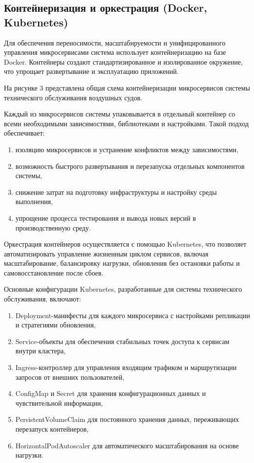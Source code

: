 \documentclass[14pt,a4paper]{extarticle}
\begin{document}
\subsection{Контейнеризация и оркестрация (Docker, Kubernetes)}

Для обеспечения переносимости, масштабируемости и унифицированного управления микросервисами система использует контейнеризацию на базе Docker. Контейнеры создают стандартизированное и изолированное окружение, что упрощает развертывание и эксплуатацию приложений.

На рисунке 3 представлена общая схема контейнеризации микросервисов системы технического обслуживания воздушных судов.


Каждый из микросервисов системы упаковывается в отдельный контейнер со всеми необходимыми зависимостями, библиотеками и настройками. Такой подход обеспечивает:

\begin{enumerate}
\item изоляцию микросервисов и устранение конфликтов между зависимостями,
\item возможность быстрого развертывания и перезапуска отдельных компонентов системы,
\item снижение затрат на подготовку инфраструктуры и настройку среды выполнения,
\item упрощение процесса тестирования и вывода новых версий в производственную среду.
\end{enumerate}

Оркестрация контейнеров осуществляется с помощью Kubernetes, что позволяет автоматизировать управление жизненным циклом сервисов, включая масштабирование, балансировку нагрузки, обновления без остановки работы и самовосстановление после сбоев.

Основные конфигурации Kubernetes, разработанные для системы технического обслуживания, включают:

\begin{enumerate}
\item Deployment-манифесты для каждого микросервиса с настройками репликации и стратегиями обновления,
\item Service-объекты для обеспечения стабильных точек доступа к сервисам внутри кластера,
\item Ingress-контроллер для управления входящим трафиком и маршрутизации запросов от внешних пользователей,
\item ConfigMap и Secret для хранения конфигурационных данных и чувствительной информации,
\item PersistentVolumeClaim для постоянного хранения данных, переживающих перезапуск контейнеров,
\item HorizontalPodAutoscaler для автоматического масштабирования на основе нагрузки.
\end{enumerate}
\end{document}

